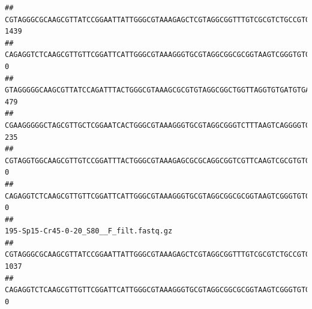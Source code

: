 \documentclass[]{article}
\begin{document}
\begin{verbatim}
## CGTAGGGCGCAAGCGTTATCCGGAATTATTGGGCGTAAAGAGCTCGTAGGCGGTTTGTCGCGTCTGCCGTGAAAGTCCGGGGCTCAACTCCGGATCTGCGGTGGGTACGGGCAGACTAGAGTGATGTAGGGGAGACTGGAATTCCTGGTGTAGCGGTGAAATGCGCAGATATCAGGAGGAACACCGATGGCGAAGGCAGGTCTCTGGGCATTAACTGACGCTGAGGAGCGAAAGCATGGGGAGCGAACA                                    1439
## CAGAGGTCTCAAGCGTTGTTCGGATTCATTGGGCGTAAAGGGTGCGTAGGCGGCGCGGTAAGTCGGGTGTGAAATCTCGGAGCTTAACTCCGAAACTGCATTCGATACTGCCGTGCTTGAGGACTGGAGAGGAGACTGGAATTTACGGTGTAGCGGTGAAATGCGTAGATATCGTAAGGAAGACCAGTGGCGAAGGCGGGTCTCTGGACAGTTCCTGACGCTGAGGCACGAAGGCCAGGGGAGCAAACG                                       0
## GTAGGGGGCAAGCGTTATCCAGATTTACTGGGCGTAAAGCGCGTGTAGGCGGCTGGTTAGGTGTGATGTGAAATCTTCCGGCTCAACCGGAAAACTGCATTGCAAACCGGCCTGGCTAGAGTGCAGGAGAGGGAAGCGGAATTCCAGGTGTAGCGGTGAAATGCGTAGATATCTGGAGGAACACCAGTGGCGAAGGCGGCTTCCTGGCCTGCAACTGACGCTGAGACGCGAAAGCGTGGGGAGCGAAC                                      479
## CGAAGGGGGCTAGCGTTGCTCGGAATCACTGGGCGTAAAGGGTGCGTAGGCGGGTCTTTAAGTCAGGGGTGAAATCCTGGAGCTCAACTCCAGAACTGCCTTTGATACTGAAGATCTTGAGTTCGGGAGAGGTGAGTGGAACTGCGAGTGTAGAGGTGAAATTCGTAGATATTCGCAAGAACACCAGTGGCGAAGGCGGCTCACTGGCCCGATACTGACGCTGAGGCACGAAAGCGTGGGGAGCAAACA                                     235
## CGTAGGTGGCAAGCGTTGTCCGGATTTACTGGGCGTAAAGAGCGCGCAGGCGGTCGTTCAAGTCGCGTGTGAAAGCCCCCGGCTCAACTGGGGAGGGTCACGCGATACTGATCGACTCGAAGGCAGGAGAGGGTAGTGGAATTCCCGGTGTAGTGGTGAAATGCGTAGATATCGGGAGGAACACCAGTGGCGAAGGCGACTACCTGGCCTGTTCTTGACGCTGAGGCGCGAAAGCTAGGGGAGCAAACG                                       0
## CAGAGGTCTCAAGCGTTGTTCGGATTCATTGGGCGTAAAGGGTGCGTAGGCGGCGCGGTAAGTCGGGTGTGAAATCTCGGGGCTTAACTCCGAAACTGCATTCGATACTGCCGTGCTTGAGGACTGGAGAGGAGACTGGAATTTACGGTGTAGCGGTGAAATGCGTAGATATCGTAAGGAAGACCAGTGGCGAAGGCGGGTCTCTGGACAGTTCCTGACGCTGAGGCACGAAGGCCAGGGGAGCAAACG                                       0
##                                                                                                                                                                                                                                                           195-Sp15-Cr45-0-20_S80__F_filt.fastq.gz
## CGTAGGGCGCAAGCGTTATCCGGAATTATTGGGCGTAAAGAGCTCGTAGGCGGTTTGTCGCGTCTGCCGTGAAAGTCCGGGGCTCAACTCCGGATCTGCGGTGGGTACGGGCAGACTAGAGTGATGTAGGGGAGACTGGAATTCCTGGTGTAGCGGTGAAATGCGCAGATATCAGGAGGAACACCGATGGCGAAGGCAGGTCTCTGGGCATTAACTGACGCTGAGGAGCGAAAGCATGGGGAGCGAACA                                    1037
## CAGAGGTCTCAAGCGTTGTTCGGATTCATTGGGCGTAAAGGGTGCGTAGGCGGCGCGGTAAGTCGGGTGTGAAATCTCGGAGCTTAACTCCGAAACTGCATTCGATACTGCCGTGCTTGAGGACTGGAGAGGAGACTGGAATTTACGGTGTAGCGGTGAAATGCGTAGATATCGTAAGGAAGACCAGTGGCGAAGGCGGGTCTCTGGACAGTTCCTGACGCTGAGGCACGAAGGCCAGGGGAGCAAACG                                       0

\end{verbatim}
\end{document}
